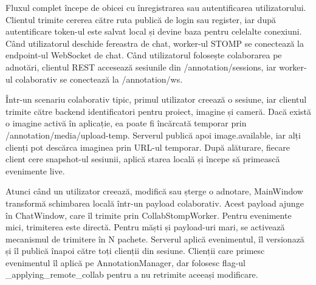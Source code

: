Fluxul complet începe de obicei cu înregistrarea sau autentificarea utilizatorului. Clientul trimite cererea către ruta publică de login sau register, iar după autentificare token-ul este salvat local și devine baza pentru celelalte conexiuni. Când utilizatorul deschide fereastra de chat, worker-ul STOMP se conectează la endpoint-ul WebSocket de chat. Când utilizatorul folosește colaborarea pe adnotări, clientul REST accesează sesiunile din /annotation/sessions, iar worker-ul colaborativ se conectează la /annotation/ws.

Într-un scenariu colaborativ tipic, primul utilizator creează o sesiune, iar clientul trimite către backend identificatori pentru proiect, imagine și cameră. Dacă există o imagine activă în aplicație, ea poate fi încărcată temporar prin /annotation/media/upload-temp. Serverul publică apoi image.available, iar alți clienți pot descărca imaginea prin URL-ul temporar. După alăturare, fiecare client cere snapshot-ul sesiunii, aplică starea locală și începe să primească evenimente live.

Atunci când un utilizator creează, modifică sau șterge o adnotare, MainWindow transformă schimbarea locală într-un payload colaborativ. Acest payload ajunge în ChatWindow, care îl trimite prin CollabStompWorker. Pentru evenimente mici, trimiterea este directă. Pentru măști și payload-uri mari, se activează mecanismul de trimitere în N pachete. Serverul aplică evenimentul, îl versionază și îl publică înapoi către toți clienții din sesiune. Clienții care primesc evenimentul îl aplică pe AnnotationManager, dar folosesc flag-ul \_applying\_remote\_collab pentru a nu retrimite aceeași modificare.

